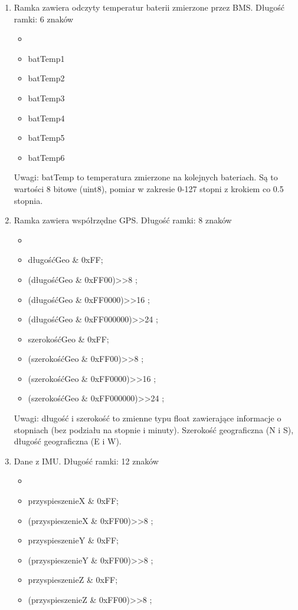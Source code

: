 \documentclass{article}
\begin{document}
\begin{enumerate}
   	\item Ramka zawiera odczyty temperatur baterii zmierzone przez BMS. Długość ramki: 6 znaków
  		\begin{itemize}
  		\item {}
  		\item batTemp1
  		\item batTemp2
  		\item batTemp3
  		\item batTemp4
  		\item batTemp5
  		\item batTemp6	
  		\end{itemize} 
  	Uwagi: batTemp to temperatura zmierzone na kolejnych bateriach. Są to wartości 8 bitowe (uint8), pomiar w zakresie 0-127 stopni z krokiem co 0.5 stopnia. 
  	\item Ramka zawiera współrzędne GPS. Długość ramki: 8 znaków
  		\begin{itemize}
  		\item {}
  		\item długośćGeo \& 0xFF;
  		\item (długośćGeo \& 0xFF00)>>8 ;
  		\item (długośćGeo \& 0xFF0000)>>16 ;
  		\item (długośćGeo \& 0xFF000000)>>24 ;
  		\item szerokośćGeo \& 0xFF;
  		\item (szerokośćGeo \& 0xFF00)>>8 ;
  		\item (szerokośćGeo \& 0xFF0000)>>16 ;
  		\item (szerokośćGeo \& 0xFF000000)>>24 ;
  		\end{itemize}
  		Uwagi: długość i szerokość to zmienne typu float zawierające informacje o stopniach (bez podziału na stopnie i minuty). Szerokość geograficzna (N i S), długość geograficzna (E i W).
  	\item Dane z IMU. Długość ramki: 12 znaków
  		\begin{itemize}
  		\item {}
		\item przyspieszenieX \& 0xFF;
  		\item (przyspieszenieX \& 0xFF00)>>8 ;
  		\item przyspieszenieY \& 0xFF;
  		\item (przyspieszenieY \& 0xFF00)>>8 ;
  		\item przyspieszenieZ \& 0xFF;
  		\item (przyspieszenieZ \& 0xFF00)>>8 ;

\end{itemize}
\end{enumerate}
\end{document}
